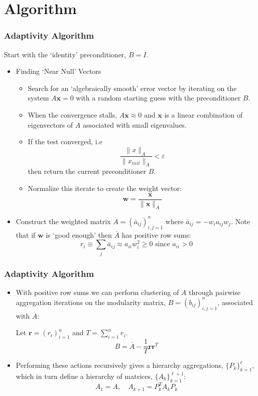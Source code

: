 \documentclass[xcolor=dvipsnames]{beamer}
\newcommand{\vc}{\boldsymbol}
\newcommand{\e}{\varepsilon}
\begin{document}
\section{Algorithm}
\begin{frame}
  \frametitle{Adaptivity Algorithm}
  Start with the `identity' preconditioner, $B = I$.
  \begin{itemize}
    \item Finding `Near Null' Vectors
      \begin{itemize}
        \item Search for an `algebraically smooth' error vector
          by iterating on the system $A \vc x = 0$ with a random
          starting guess with the preconditioner $B$.
        \item When the convergence stalls, $A \vc x \approx 0$
          and $\vc x$ is a linear combination of eigenvectors of 
          $A$ associated with small eigenvalues.
        \item If the test converged, i.e
          $$\frac{\|x\|_A}{\|x_{init}\|_A} < \e$$
          then return the current preconditioner $B$.
        \item Normalize this iterate to create the weight vector:
          $$\vc w = \frac{\vc x}{\|\vc x\|_A}$$
      \end{itemize}
    \item Construct the weighted matrix
      $\overline{A} = (\overline{a}_{ij})^n_{i,j=1}$ where
      $\overline{a}_{ij} = -w_i a_{ij} w_j$. Note that if
      $\vc w$ is `good enough' then $\overline{A}$ has positive
      row sums:
      $$r_i \equiv \sum_j \overline{a}_{ij} \approx a_{ii} w_i^2 \geq 0 \text{ since } a_{ii} > 0$$

  \end{itemize}

\end{frame}

\begin{frame}
  \frametitle{Adaptivity Algorithm}
  \begin{itemize}
    \item With positive row sums we can perform clustering of $A$
      through pairwise aggregation iterations on the modularity
      matrix, $B = (b_{ij})_{i,j=1}^n$, 
      associated with $\overline{A}$:

      Let $\vc r = (r_i)_{i=1}^n$ and $T = \sum_{i=1}^n r_i$.
      $$B = \overline{A} - \frac{1}{T} \vc r \vc r^T$$
    \item Performing these actions recursively gives a hierarchy
      aggregations, $\{P_k\}_{k=1}^\ell$, which in turn define a
      hierarchy of matrices, $\{A_k\}_{k=1}^{\ell+1}$:
      $$A_1 = A, \quad A_{k+1} = P_k^T A_k P_k $$
  \end{itemize}

\end{frame}
\end{document}

